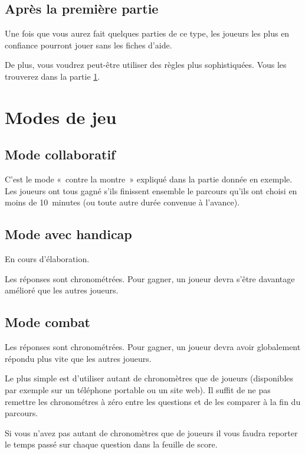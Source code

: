 \documentclass[11pt]{article}
\begin{document}
\subsection{Après la première partie}

Une fois que vous aurez fait quelques parties de ce type, les joueurs les plus
en confiance pourront jouer sans les fiches d’aide.

De plus, vous voudrez peut-être utiliser des règles plus sophistiquées. Vous
les trouverez dans la partie \ref{modes}.

\section{Modes de jeu} \label{modes}

\subsection{Mode collaboratif}

C’est le mode « contre la montre » expliqué dans la partie donnée en exemple.
Les joueurs ont tous gagné s’ils finissent ensemble le parcours qu’ils ont
choisi en moins de 10 minutes (ou toute autre durée convenue à l’avance).

\subsection{Mode avec handicap}

En cours d’élaboration.

Les réponses sont chronométrées. Pour gagner, un joueur devra s’être davantage
amélioré que les autres joueurs.

\subsection{Mode combat}

Les réponses sont chronométrées. Pour gagner, un joueur devra avoir
globalement répondu plus vite que les autres joueurs.

Le plus simple est d’utiliser autant de chronomètres que de joueurs
(disponibles par exemple sur un téléphone portable ou un site web). Il suffit
de ne pas remettre les chronométres à zéro entre les questions et de les
comparer à la fin du parcours.

Si vous n’avez pas autant de chronomètres que de joueurs il vous faudra
reporter le temps passé sur chaque question dans la feuille de score.
\end{document}
